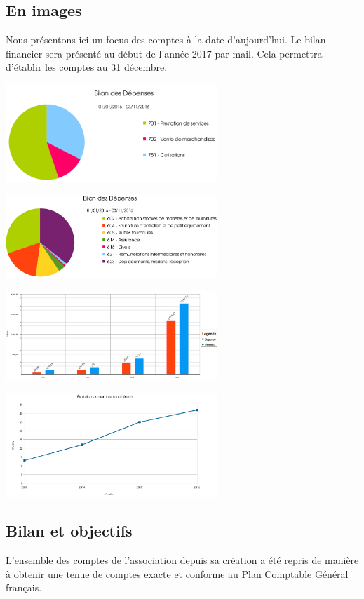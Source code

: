 \documentclass[11pt]{article}
\begin{document}
\subsection{En images}
Nous présentons ici un focus des comptes à la date d'aujourd'hui. Le bilan financier
sera présenté au début de l'année 2017 par mail. Cela permettra d'établir les comptes
au 31 décembre.
\begin{center}
\begin{multicols}{2}
\includegraphics[width=8cm]{1DossierAGRecettes.png}

\includegraphics[width=8cm]{2DossierAGDepenses.png}
\end{multicols}

\begin{multicols}{2}
\includegraphics[width=8cm]{3DossierAGGeneral.png}

\includegraphics[width=8cm]{4DossierAGAdherents.png}
\end{multicols}
\end{center}
\subsection{Bilan et objectifs}
L'ensemble des comptes de l'association depuis sa création a été repris de manière
à obtenir une tenue de comptes exacte et conforme au Plan Comptable Général français.
\end{document}
